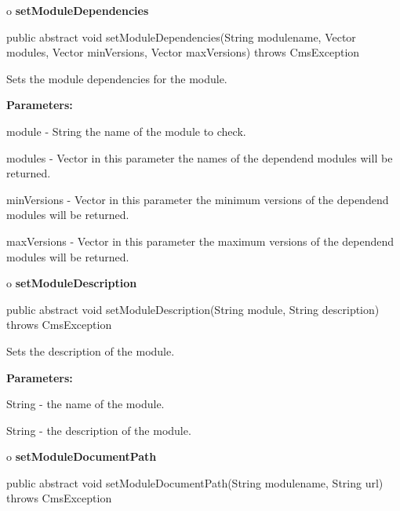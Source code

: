 o {\bf setModuleDependencies} 

\begin{PRE}
 public abstract void setModuleDependencies(String modulename,
                                            Vector modules,
                                            Vector minVersions,
                                            Vector maxVersions) throws CmsException
\end{PRE}

\begin{description}
\htmlDD Sets the module dependencies for the module. 

\begin{description}
\item {\bf Parameters:}  

module - String the name of the module to check.  

modules - Vector in this parameter the names of the dependend modules will be
returned.  

minVersions - Vector in this parameter the minimum versions of the dependend
modules will be returned.  

maxVersions - Vector in this parameter the maximum versions of the dependend
modules will be returned.  
\end{description}

\end{description}

o {\bf setModuleDescription} 

\begin{PRE}
 public abstract void setModuleDescription(String module,
                                           String description) throws CmsException
\end{PRE}

\begin{description}
\htmlDD Sets the description of the module. 

\begin{description}
\item {\bf Parameters:}  

String - the name of the module.  

String - the description of the module.  
\end{description}

\end{description}

o {\bf setModuleDocumentPath} 

\begin{PRE}
 public abstract void setModuleDocumentPath(String modulename,
                                            String url) throws CmsException
\end{PRE}

